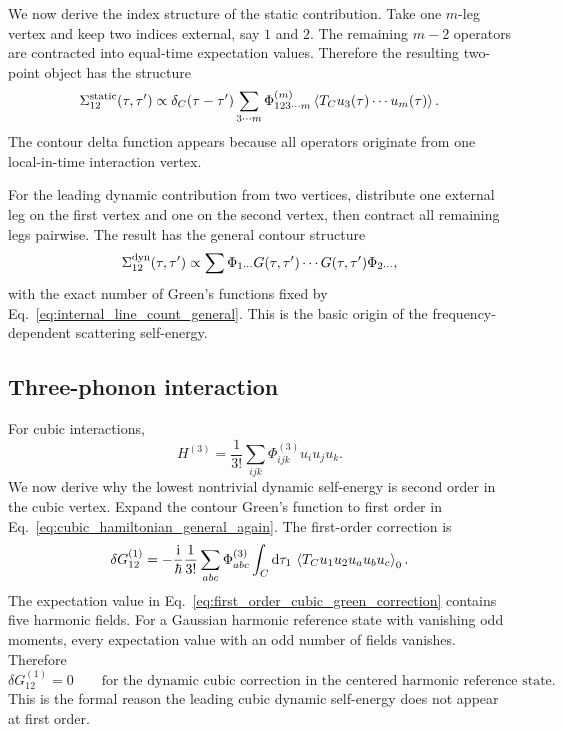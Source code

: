 We now derive the index structure of the static contribution. Take one $m$-leg vertex and keep two indices external, say $1$ and $2$. The remaining $m-2$ operators are contracted into equal-time expectation values. Therefore the resulting two-point object has the structure
\begin{equation}
    \Sigma^{\rm static}_{12}(\tau,\tau')
    \propto
    \delta_C(\tau-\tau')
    \sum_{3\cdots m}
    \Phi^{(m)}_{12 3\cdots m}
    \left\langle T_C u_3(\tau)\cdots u_m(\tau) \right\rangle.
    \label{eq:static_self_energy_general_detail}
\end{equation}
The contour delta function appears because all operators originate from one local-in-time interaction vertex.

For the leading dynamic contribution from two vertices, distribute one external leg on the first vertex and one on the second vertex, then contract all remaining legs pairwise. The result has the general contour structure
\begin{equation}
    \Sigma^{\rm dyn}_{12}(\tau,\tau')
    \propto
    \sum \Phi_{1\cdots} G(\tau,\tau')\cdots G(\tau,\tau')\Phi_{2\cdots},
    \label{eq:dynamic_self_energy_general_detail}
\end{equation}
with the exact number of Green's functions fixed by Eq.~\eqref{eq:internal_line_count_general}. This is the basic origin of the frequency-dependent scattering self-energy.

\subsection{Three-phonon interaction}
For cubic interactions,
\begin{equation}
    H^{(3)} = \frac{1}{3!}\sum_{ijk}\Phi^{(3)}_{ijk}u_i u_j u_k.
    \label{eq:cubic_hamiltonian_general_again}
\end{equation}
We now derive why the lowest nontrivial dynamic self-energy is second order in the cubic vertex. Expand the contour Green's function to first order in Eq.~\eqref{eq:cubic_hamiltonian_general_again}. The first-order correction is
\begin{equation}
    \delta G^{(1)}_{12}
    =
    -\frac{\mathrm{i}}{\hbar}
    \frac{1}{3!}
    \sum_{abc}\Phi^{(3)}_{abc}
    \int_C \mathrm{d}\tau_1\,
    \left\langle T_C u_1 u_2 u_a u_b u_c \right\rangle_0.
    \label{eq:first_order_cubic_green_correction}
\end{equation}
The expectation value in Eq.~\eqref{eq:first_order_cubic_green_correction} contains five harmonic fields. For a Gaussian harmonic reference state with vanishing odd moments, every expectation value with an odd number of fields vanishes. Therefore
\begin{equation}
    \delta G^{(1)}_{12} = 0
    \qquad
    \text{for the dynamic cubic correction in the centered harmonic reference state.}
\end{equation}
This is the formal reason the leading cubic dynamic self-energy does not appear at first order.

